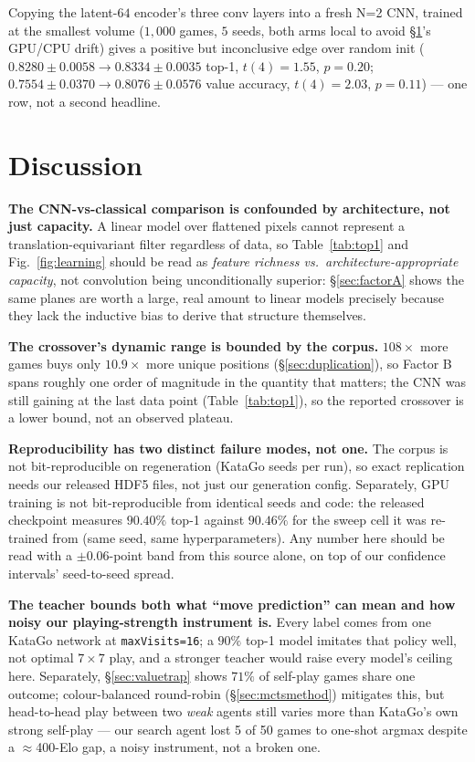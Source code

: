 \documentclass[conference,a4paper]{IEEEtran}
\begin{document}
Copying the latent-$64$ encoder's three conv layers into a fresh N=2 CNN,
trained at the smallest volume ($1{,}000$ games, $5$ seeds, both arms local
to avoid \S\ref{sec:discussion}'s GPU/CPU drift) gives a positive but
inconclusive edge over random init ($0.8280\pm0.0058 \to 0.8334\pm0.0035$
top-1, $t(4){=}1.55$, $p{=}0.20$; $0.7554\pm0.0370 \to 0.8076\pm0.0576$ value
accuracy, $t(4){=}2.03$, $p{=}0.11$) --- one row, not a second headline.

\section{Discussion}
\label{sec:discussion}

\textbf{The CNN-vs-classical comparison is confounded by architecture, not
just capacity.} A linear model over flattened pixels cannot represent a
translation-equivariant filter regardless of data, so Table~\ref{tab:top1}
and Fig.~\ref{fig:learning} should be read as \emph{feature richness vs.\
architecture-appropriate capacity}, not convolution being unconditionally
superior: \S\ref{sec:factorA} shows the same planes are worth a large, real
amount to linear models precisely because they lack the inductive bias to
derive that structure themselves.

\textbf{The crossover's dynamic range is bounded by the corpus.} $108\times$
more games buys only $10.9\times$ more unique positions
(\S\ref{sec:duplication}), so Factor B spans roughly one order of magnitude
in the quantity that matters; the CNN was still gaining at the last data
point (Table~\ref{tab:top1}), so the reported crossover is a lower bound,
not an observed plateau.

\textbf{Reproducibility has two distinct failure modes, not one.} The corpus
is not bit-reproducible on regeneration (KataGo seeds per run), so exact
replication needs our released HDF5 files, not just our generation config.
Separately, GPU training is not bit-reproducible from identical seeds and
code: the released checkpoint measures $90.40\%$ top-1 against $90.46\%$ for
the sweep cell it was re-trained from (same seed, same hyperparameters). Any
number here should be read with a $\pm0.06$-point band from this source
alone, on top of our confidence intervals' seed-to-seed spread.

\textbf{The teacher bounds both what ``move prediction'' can mean and how
noisy our playing-strength instrument is.} Every label comes from one
KataGo network at \texttt{maxVisits=16}; a $90\%$ top-1 model imitates that
policy well, not optimal $7\times7$ play, and a stronger teacher would raise
every model's ceiling here. Separately, \S\ref{sec:valuetrap} shows $71\%$
of self-play games share one outcome; colour-balanced round-robin
(\S\ref{sec:mctsmethod}) mitigates this, but head-to-head play between two
\emph{weak} agents still varies more than KataGo's own strong self-play ---
our search agent lost 5 of 50 games to one-shot argmax despite a
$\approx$400-Elo gap, a noisy instrument, not a broken one.
\end{document}
